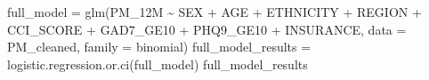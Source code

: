 \documentclass[
]{article}
\newenvironment{Shaded}{\begin{snugshade}}{\end{snugshade}}
\newcommand{\AttributeTok}[1]{\textcolor[rgb]{0.77,0.63,0.00}{#1}}
\newcommand{\FunctionTok}[1]{\textcolor[rgb]{0.00,0.00,0.00}{#1}}
\newcommand{\NormalTok}[1]{#1}
\newcommand{\OtherTok}[1]{\textcolor[rgb]{0.56,0.35,0.01}{#1}}
\newcommand{\SpecialCharTok}[1]{\textcolor[rgb]{0.00,0.00,0.00}{#1}}
\begin{document}
\begin{Shaded}
\begin{Highlighting}[]
\NormalTok{full\_model }\OtherTok{=} \FunctionTok{glm}\NormalTok{(PM\_12M }\SpecialCharTok{\textasciitilde{}}\NormalTok{ SEX }\SpecialCharTok{+}\NormalTok{ AGE }\SpecialCharTok{+}\NormalTok{ ETHNICITY }\SpecialCharTok{+}\NormalTok{ REGION }\SpecialCharTok{+}\NormalTok{ CCI\_SCORE }\SpecialCharTok{+}\NormalTok{ GAD7\_GE10 }\SpecialCharTok{+}\NormalTok{ PHQ9\_GE10 }\SpecialCharTok{+}\NormalTok{ INSURANCE, }\AttributeTok{data =}\NormalTok{ PM\_cleaned, }\AttributeTok{family =}\NormalTok{ binomial)}
\NormalTok{full\_model\_results }\OtherTok{=} \FunctionTok{logistic.regression.or.ci}\NormalTok{(full\_model)}
\NormalTok{full\_model\_results}
\end{Highlighting}
\end{Shaded}
\end{document}
